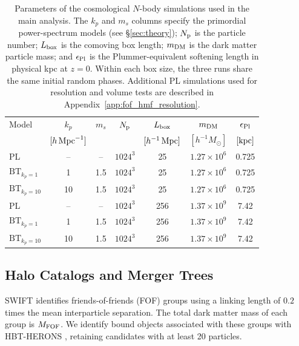 \documentclass[
 reprint,
 superscriptaddress,
 nofootinbib,
 nobibnotes,
 amsmath,
 amssymb,
 aps,
 prd,
 floatfix,
 longbibliography
]{revtex4-2}
\DeclareRobustCommand{\change}[1]{#1}
\DeclareRobustCommand{\BTKPone}{\ensuremath{\mathrm{BT}_{k_p=1}}}
\DeclareRobustCommand{\BTKPten}{\ensuremath{\mathrm{BT}_{k_p=10}}}
\begin{document}
\begin{table}[t]
\caption{\change{Parameters of the cosmological \(N\)-body simulations used in the main analysis. The \(k_p\) and \(m_s\) columns specify the primordial power-spectrum models (see \S\ref{sec:theory}); \(N_{\rm p}\) is the particle number; \(L_{\rm box}\) is the comoving box length; \(m_{\rm DM}\) is the dark matter particle mass; and \(\epsilon_{\rm Pl}\) is the Plummer-equivalent softening length in physical kpc at \(z=0\). Within each box size, the three runs share the same initial random phases. Additional PL simulations used for resolution and volume tests are described in Appendix~\ref{app:fof_hmf_resolution}.}}
\label{tab:simulation_parameters}
\label{tab:Params_all_models}
\centering
\begin{ruledtabular}
\begin{tabular}{lcccccc}
Model & \(k_p\) & \(m_s\) & \(N_{\rm p}\) & \(L_{\rm box}\) & \(m_{\rm DM}\) & \(\epsilon_{\rm Pl}\) \\
 & \([h\,{\rm Mpc}^{-1}]\) & & & \([h^{-1}\,{\rm Mpc}]\) & \([h^{-1}M_\odot]\) & \([{\rm kpc}]\) \\
\colrule
PL & -- & -- & \(1024^3\) & 25 & \(1.27\times 10^6\) & 0.725 \\
\BTKPone{} & 1 & 1.5 & \(1024^3\) & 25 & \(1.27\times 10^6\) & 0.725 \\
\BTKPten{} & 10 & 1.5 & \(1024^3\) & 25 & \(1.27\times 10^6\) & 0.725 \\
\colrule
\change{PL} & \change{--} & \change{--} & \change{\(1024^3\)} & \change{256} & \change{\(1.37\times 10^9\)} & \change{7.42} \\
\change{\BTKPone{}} & \change{1} & \change{1.5} & \change{\(1024^3\)} & \change{256} & \change{\(1.37\times 10^9\)} & \change{7.42} \\
\change{\BTKPten{}} & \change{10} & \change{1.5} & \change{\(1024^3\)} & \change{256} & \change{\(1.37\times 10^9\)} & \change{7.42} \\
\end{tabular}
\end{ruledtabular}
\end{table}


\subsection{Halo Catalogs and Merger Trees}
\label{subsec:halo_catalogs}

\change{\textsc{SWIFT} identifies friends-of-friends (FOF) groups \citep{Davis1985FOF} using a linking length of \(0.2\) times the mean interparticle separation. The total dark matter mass of each group is \(M_{\rm FOF}\). We identify bound objects associated with these groups with \textsc{HBT-HERONS} \citep{Victor25HBTHERONS}, retaining candidates with at least 20 particles.}
\end{document}
